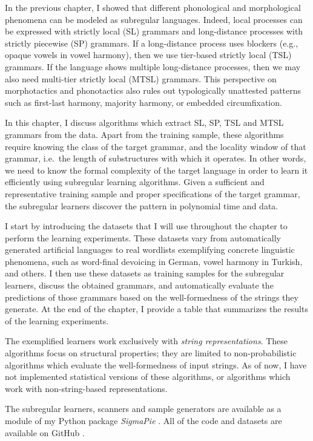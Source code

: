 In the previous chapter, I showed that different phonological and morphological phenomena can be modeled as subregular languages.
Indeed, local processes can be expressed with strictly local (SL) grammars and long-distance processes with strictly piecewise (SP) grammars.
If a long-distance process uses blockers (e.g., opaque vowels in vowel harmony), then we use tier-based strictly local (TSL) grammars.
If the language shows multiple long-distance processes, then we may also need  multi-tier strictly local (MTSL) grammars.
This perspective on morphotactics and phonotactics also rules out typologically unattested patterns such as first-last harmony, majority harmony, or embedded circumfixation.

In this chapter, I discuss algorithms which extract SL, SP, TSL and MTSL grammars from the data.
Apart from the training sample, these algorithms require knowing the class of the target grammar, and the locality window of that grammar, i.e.\ the length of substructures with which it operates.
In other words, we need to know the formal complexity of the target language in order to learn it efficiently using subregular learning algorithms.
Given a sufficient and representative training sample and proper specifications of the target grammar, the subregular learners discover the pattern in polynomial time and data.

I start by introducing the datasets that I will use throughout the chapter to perform the learning experiments.
These datasets vary from automatically generated artificial languages to real wordlists exemplifying concrete linguistic phenomena, such as word-final devoicing in German, vowel harmony in Turkish, and others.
I then use these datasets as training samples for the subregular learners, discuss the obtained grammars, and automatically evaluate the predictions of those grammars based on the well-formedness of the strings they generate.
At the end of the chapter, I provide a table that summarizes the results of the learning experiments.

The exemplified learners work exclusively with \emph{string representations}.
These algorithms focus on structural properties; they are limited to non-probabilistic algorithms which evaluate the well-formedness of input strings.
As of now, I have not implemented statistical versions of these algorithms, or algorithms which work with non-string-based representations.


The subregular learners, scanners and sample generators are available as a module of my Python package \emph{SigmaPie} \href{https://pypi.org/project/SigmaPie/}{\faCube} \citep{sigmapie}.
All of the code and datasets are available on GitHub \href{https://github.com/alenaks/subregular-experiments}{\faGithub} \citep{GHsubex}.



